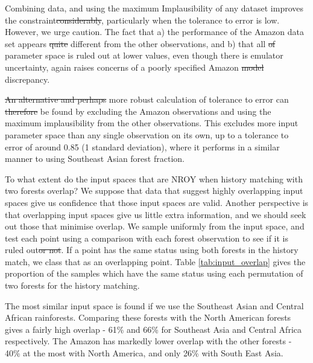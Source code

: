 \documentclass[esd, manuscript]{copernicus}
\providecommand{\DIFadd}[1]{{\protect\color{blue}\uwave{#1}}} %
\providecommand{\DIFdel}[1]{{\protect\color{red}\sout{#1}}}                      %
\providecommand{\DIFaddbegin}{} %
\providecommand{\DIFaddend}{} %
\providecommand{\DIFdelbegin}{} %
\providecommand{\DIFdelend}{} %
\begin{document}
Combining data, and using the maximum Implausibility of any dataset improves the constraint\DIFdelbegin \DIFdel{considerably}\DIFdelend , particularly when the tolerance to error is low. However, we urge caution. The fact that a) the performance of the Amazon data set appears \DIFdelbegin \DIFdel{quite }\DIFdelend different from the other observations, and b) that all \DIFdelbegin \DIFdel{of }\DIFdelend parameter space is ruled out at lower values, even though there is emulator uncertainty, again raises concerns of a poorly specified Amazon \DIFdelbegin \DIFdel{model }\DIFdelend \DIFaddbegin \DIFadd{simulator }\DIFaddend discrepancy. 

\DIFdelbegin \DIFdel{An alternative and perhaps }\DIFdelend \DIFaddbegin \DIFadd{A }\DIFaddend more robust calculation of tolerance to error can \DIFdelbegin \DIFdel{therefore }\DIFdelend be found by excluding the Amazon observations and using the maximum implausibility from the other observations. This excludes more input parameter space than any single observation on its own, up to a tolerance to error of around 0.85 (1 standard deviation), where it performs in a similar manner to using Southeast Asian forest fraction.


To what extent do the input spaces that are NROY when history matching with two forests overlap? We suppose that data that suggest highly overlapping input spaces give us confidence that those input spaces are valid. Another perspective is that overlapping input spaces give us little extra information, and we should seek out those that minimise overlap. We sample uniformly from the input space, and test each point using a comparison with each forest observation to see if it is ruled out\DIFdelbegin \DIFdel{or not}\DIFdelend . If a point has the same status using both forests in the history match, we class that as an overlapping point. Table \ref{tab:input_overlap} gives the proportion of the samples which have the same status using each permutation of two forests for the history matching.

The most similar input space is found if we use the Southeast Asian and Central African rainforests. Comparing these forests with the North American forests gives a fairly high overlap - 61\% and 66\% for Southeast Asia and Central Africa respectively. The Amazon has markedly lower overlap with the other forests - 40\% at the most with North America, and only 26\% with South East Asia.
\end{document}
